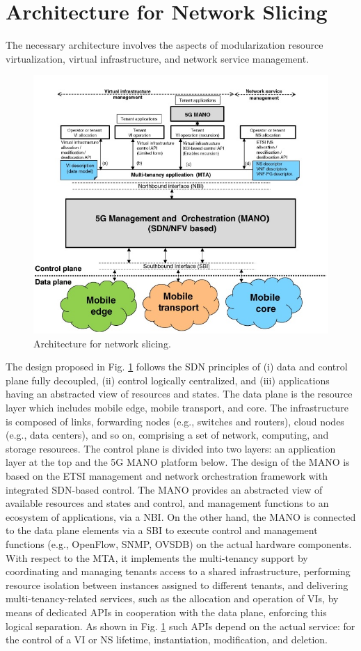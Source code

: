 \documentclass{article}
\begin{document}
\section{Architecture for Network Slicing}
The necessary architecture involves the aspects of modularization resource virtualization, virtual infrastructure, and network service management.
\begin{figure}[h]
\centering
\includegraphics[scale=0.67]{pics/2.JPG}
\caption{Architecture for network slicing.} 
\label{Arch}
\end{figure}
The design proposed in Fig. \ref{Arch} follows the SDN principles of
(i) data and control plane fully decoupled, (ii) control logically centralized, and (iii) applications having an abstracted view of resources and states.
The data plane is the resource layer which includes mobile edge, mobile transport, and core. The infrastructure is composed of links, forwarding nodes (e.g., switches and routers), cloud nodes (e.g., data centers), and so on, comprising a set of network, computing, and storage resources.
The control plane is divided into two layers: an application layer at the top and the 5G \gls{MANO} platform below. The design
of the MANO is based on the ETSI management and network orchestration framework with integrated SDN-based control. The MANO
provides an abstracted view of available resources and states and control, and
management functions to an ecosystem of applications, via a \gls{NBI}. On the other hand, the MANO is connected to the data plane
elements via a \gls{SBI} to execute control and management
functions (e.g., OpenFlow, SNMP, OVSDB) on the actual hardware components.
With respect to the \gls{MTA}, it implements the
multi-tenancy support by coordinating and managing tenants access to a shared
infrastructure, performing resource isolation between instances assigned to
different tenants, and delivering multi-tenancy-related services, such as the
allocation and operation of VIs, by means of dedicated APIs in cooperation
with the data plane, enforcing this logical separation. As shown in Fig. \ref{Arch}
such APIs depend on the actual service: for the control of a VI or NS lifetime,
instantiation, modification, and deletion.
\end{document}
